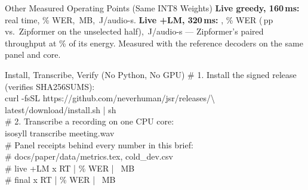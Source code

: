 \documentclass[letterpaper]{article}
\begin{document}
\begin{minipage}[t]{0.486\textwidth}
  \vspace{3pt}
  \begin{execbox}[accent]{Other Measured Operating Points (Same INT8 Weights)}
    \textbf{Live greedy, 160\,ms:} \ColdRcTwoLiveGreedySpeed\x{} real time, \ColdRcTwoLiveGreedyWer\% WER, \ColdRcTwoLiveGreedyRss\,MB, \ColdRcTwoLiveGreedyWatts\,J/audio-s. \textbf{Live +LM, 320\,ms:} \ColdRcTwoLiveLmWideSpeed\x, \ColdRcTwoLiveLmWideWer\% WER (\CandLiveLmEightCDelta\,pp vs.\ Zipformer on the unselected half), \ColdRcTwoLiveLmWideWatts\,J/audio-s --- \VsWideSpeedX\x{} Zipformer's paired throughput at \VsWideEnergyPct\% of its energy. Measured with the reference decoders on the same panel and core.
  \end{execbox}
\end{minipage}\hfill
\begin{minipage}[t]{0.486\textwidth}
  \vspace{0pt}
  \begin{codecard}{Install, Transcribe, Verify (No Python, No GPU)}
{\color{codecomment}\# 1. Install the signed release (verifies SHA256SUMS):}\\
curl -fsSL https://github.com/neverhuman/jsr/releases/\textbackslash\\
\hspace*{1.2em}latest/download/install.sh | sh\\[2.5pt]
{\color{codecomment}\# 2. Transcribe a recording on one CPU core:}\\
isosyll transcribe meeting.wav\\[2.5pt]
{\color{codecomment}\# Panel receipts behind every number in this brief:}\\
{\color{codecomment}\#   docs/paper/data/metrics.tex, cold\_dev.csv}\\
{\color{codecomment}\#   live +LM  \ColdRcTwoLiveLmSpeed x RT | \ColdRcTwoLiveLmWer\% WER | \ColdRcTwoLiveLmRss\ MB}\\
{\color{codecomment}\#   final     \ColdRcTwoFinalSpeed x RT | \ColdRcTwoFinalWer\% WER | \ColdRcTwoFinalRss\ MB}
  \end{codecard}


\end{minipage}
\end{document}
